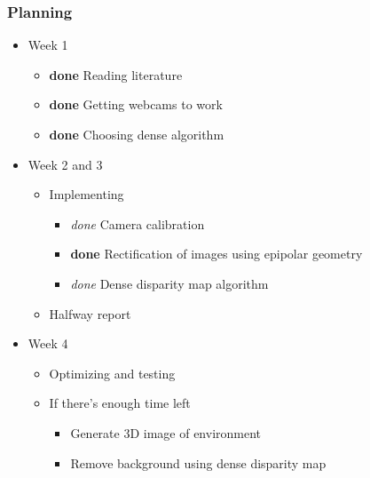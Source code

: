 \documentclass{beamer}
\begin{document}


\frame
{
  \frametitle{Planning}
  \begin{itemize}
    \item Week 1
      \begin{itemize}
        \item {\bf done} Reading literature
        \item {\bf done} Getting webcams to work
        \item {\bf done} Choosing dense algorithm
      \end{itemize}
    \item Week 2 and 3
      \begin{itemize}
        \item Implementing
          \begin{itemize}
            \item \emph{done} Camera calibration
            \item {\bf done} Rectification of images using epipolar geometry
            \item \emph{done} Dense disparity map algorithm
          \end{itemize}
        \item Halfway report
      \end{itemize}
    \item Week 4
      \begin{itemize}
        \item Optimizing and testing
        \item If there's enough time left
          \begin{itemize}
            \item Generate 3D image of environment
            \item Remove background using dense disparity map
          \end{itemize}
      \end{itemize}
  \end{itemize}
}
\end{document}
